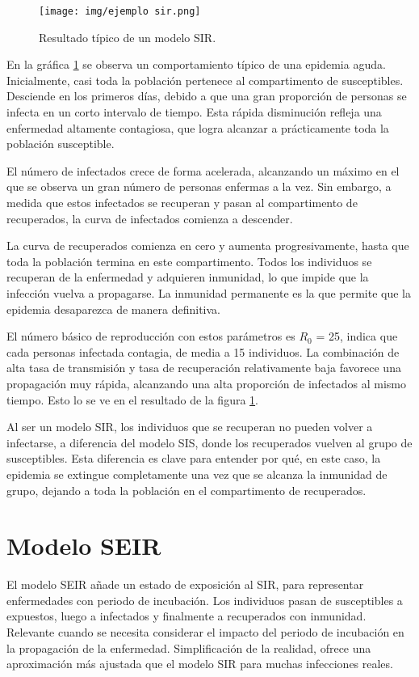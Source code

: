 \begin{figure}[htbp]
    \centering
    \texttt{[image: img/ejemplo sir.png]}
    \caption{Resultado típico de un modelo SIR.}
    \label{fig:ejemplo SIR}
    
\end{figure}


En la gráfica \ref{fig:ejemplo SIR} se observa un comportamiento típico de una epidemia aguda.
Inicialmente, casi toda la población pertenece al compartimento de susceptibles. Desciende en los primeros días, debido a que una gran proporción de personas se infecta en un corto intervalo de tiempo. Esta rápida disminución refleja una enfermedad altamente contagiosa, que logra alcanzar a prácticamente toda la población susceptible.

El número de infectados crece de forma acelerada, alcanzando un máximo en el que se observa un gran número de personas enfermas a la vez. Sin embargo, a medida que estos infectados se recuperan y pasan al compartimento de recuperados, la curva de infectados comienza a descender.

La curva de recuperados comienza en cero y aumenta progresivamente, hasta que toda la población termina en este compartimento. Todos los individuos se recuperan de la enfermedad y adquieren inmunidad, lo que impide que la infección vuelva a propagarse. La inmunidad permanente es la que permite que la epidemia desaparezca de manera definitiva.

El número básico de reproducción con estos parámetros es $R_0$ = 25, indica que cada personas infectada contagia, de media a 15 individuos. La combinación de alta tasa de transmisión y tasa de recuperación relativamente baja favorece una propagación muy rápida, alcanzando una alta proporción de infectados al mismo tiempo. Esto lo se ve en el resultado de la figura \ref{fig:ejemplo SIR}.

Al ser un modelo SIR, los individuos que se recuperan no pueden volver a infectarse, a diferencia del modelo SIS, donde los recuperados vuelven al grupo de susceptibles. Esta diferencia es clave para entender por qué, en este caso, la epidemia se extingue completamente una vez que se alcanza la inmunidad de grupo, dejando a toda la población en el compartimento de recuperados.




\section{Modelo SEIR}
El modelo SEIR añade un estado de exposición al SIR, para representar enfermedades con periodo de incubación. Los individuos pasan de susceptibles a expuestos, luego a infectados y finalmente a recuperados con inmunidad. Relevante cuando se necesita considerar el impacto del periodo de incubación en la propagación de la enfermedad. Simplificación de la realidad, ofrece una aproximación más ajustada que el modelo SIR para muchas infecciones reales.

